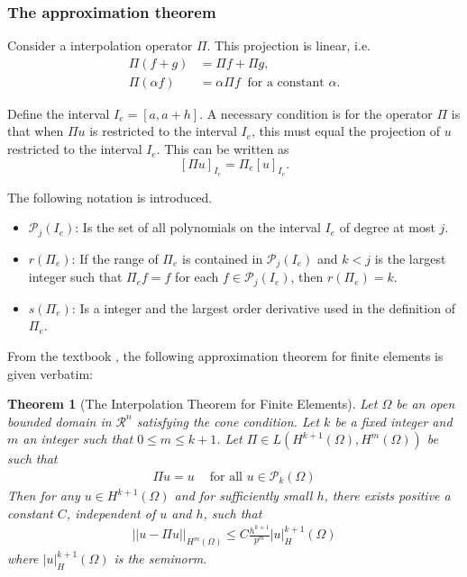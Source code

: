 \documentclass[../../main.tex]{subfiles}
\begin{document}
\subsubsection{The approximation theorem}

Consider a interpolation operator $\Pi$.\label{sym:interpolation} This projection is linear, i.e.
\begin{align*}
	\Pi(f + g) & = \Pi f + \Pi g,\\
	\Pi(\alpha f) & = \alpha \Pi f \ \text{ for a constant } \alpha. 
\end{align*}

Define the interval $I_e = [a, a+h]$. A necessary condition is for the operator $\Pi$ is that when $\Pi u$ is restricted to the interval $I_e$, this must equal the projection of $u$ restricted to the interval $I_e$. This can be written as
\begin{equation*}
	\left[ \Pi u \right]_{I_{e}} = \Pi_e [u]_{I_{e}}.
\end{equation*}

The following notation is introduced.
\begin{itemize}
	\item[] $\mathcal{P}_j(I_e)$: Is the set of all polynomials on the interval $I_e$ of degree at most $j$. \label{sym:poly}
	\item[] $r(\Pi_e)$: If the range of $\Pi_e$ is contained in $\mathcal{P}_j(I_e)$ and $k<j$ is the largest integer such that $\Pi_e f = f$ for each $f \in \mathcal{P}_j(I_e)$, then $r(\Pi_e) = k$.
	\item[] $s(\Pi_e)$: Is a integer and the largest order derivative used in the definition of $\Pi_e$.
\end{itemize}

From the textbook \cite{OR76}, the following approximation theorem for finite elements is given verbatim:
\newtheorem*{Interpolation}{Theorem}
\begin{Interpolation}[The Interpolation Theorem for Finite Elements] 
	Let $\Omega$ be an open bounded domain in $\mathcal{R}^n$ satisfying the cone condition. Let $k$ be a fixed integer and $m$ an integer such that $0\leq m \leq k+1$. Let $\Pi \in L(H^{k+1}(\Omega), H^{m}(\Omega))$ be such that
	\begin{eqnarray}
	    \Pi u = u \ \ \ \ \textrm{ for all } u \in \mathcal{P}_k(\Omega)
	\end{eqnarray}
	Then for any $u \in H^{k+1}(\Omega)$ and for sufficiently small $h$, there exists positive a constant $C$, independent of $u$ and $h$, such that
	\begin{eqnarray}
	    ||u - \Pi u||_{H^m(\Omega)} \leq C \frac{h^{k+1}}{p^m} |u|_H^{k+1}(\Omega)
	\end{eqnarray}
	where $|u|_H^{k+1}(\Omega)$ is the seminorm.
\end{Interpolation}
\end{document}
